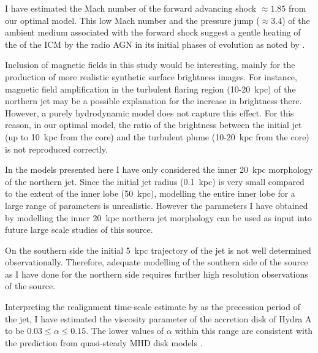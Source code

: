 
I have estimated the Mach number of the forward advancing shock $\approx 1.85$ from our optimal model. This low Mach number and the pressure jump ($\approx 3.4$) of the ambient medium associated with the forward shock  suggest a gentle heating of the of the ICM by the radio AGN in its initial phases of evolution as noted by \citet{mcnamara12}. 

Inclusion of magnetic fields in this study would be interesting, mainly for the production of more realistic synthetic surface brightness images. For instance, magnetic field amplification in the turbulent flaring region (10-20~kpc) of the northern jet may be a possible explanation for the increase in brightness there. However, a purely hydrodynamic model does not capture this effect. For this reason, in our optimal model, the ratio of the brightness between the initial jet (up to 10~kpc from the core) and the turbulent plume (10-20~kpc from the core) is not reproduced correctly. 

In the models presented here I have only considered the inner 20~kpc morphology of the northern jet. Since the initial jet radius (0.1~kpc) is very small compared to the extent of the inner lobe (50~kpc), modelling the entire inner lobe for a large range of parameters is unrealistic. However the parameters I have obtained by modelling the inner 20~kpc northern jet morphology can be used as input into future large scale studies of this source. 

On the southern side the initial 5~kpc trajectory of the jet is not well determined observationally. Therefore, adequate modelling of the southern side of the source as I have done for the northern side requires further high resolution observations of the source. 

Interpreting the realignment time-scale estimate by \citet{natarajan98} as the precession period of the jet, I have estimated the viscosity parameter of the accretion disk of Hydra A to be $0.03\le \alpha \le 0.15$. 
The lower values of $\alpha$ within this range are consistent with the prediction from quasi-steady MHD disk models \citep{parkin13b}. 